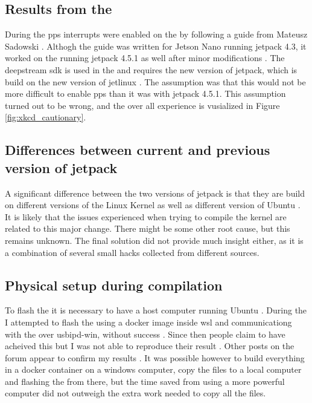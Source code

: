 \subsection{Results from the \preproject}
During the \preproject \gls{pps} interrupts were enabled on the \jx by following a guide from Mateusz Sadowski \cite{sadowskiEnablingPPSJetson2020} \cite[26]{martensPortableSensorRig2022}.
Althogh the guide was written for Jetson Nano running \gls{jetpack} 4.3, it worked on the \jx running \gls{jetpack} 4.5.1 as well after minor modifications \cite{sadowskiEnablingPPSJetson2020} \cite[26]{martensPortableSensorRig2022}.
The \gls{deepstream} \gls{sdk} is used in the \master and requires the new version of \gls{jetpack}, which is build on the new version of \gls{jetlinux}\cite{nvidiaDeepStreamSDKGet2019} \cite{nvidiaJetPackSDK2023}.
The assumption was that this would not be more difficult to enable \gls{pps} than it was with \gls{jetpack} 4.5.1.
This assumption turned out to be wrong, and the over all experience is vusialized in Figure \ref{fig:xkcd_cautionary}.

\subsection{Differences between current and previous version of \gls{jetpack}}
A significant difference between the two versions of \gls{jetpack} is that they are build on different versions of the Linux Kernel as well as different version of Ubuntu \cite{nvidiaJetPackSDK2022}\cite{nvidiaJetPackSDK2023}.
It is likely that the issues experienced when trying to compile the kernel are related to this major change.
There might be some other root cause, but this remains unknown.
The final solution did not provide much insight either, as it is a combination of several small hacks collected from different sources.

\subsection{Physical setup during compilation}
To flash the \jx it is necessary to have a host computer running Ubuntu \cite{nvidiaSDKManager2019}.
During the \preproject I attempted to flash the \jx using a docker image inside \gls{wsl} and communicationg with the \jx over usbipd-win, without success \cite{martensPortableSensorRig2022} \cite{nvidiaSDKManager2019} \cite{dorsselaerUsbipdwin2023}.
Since then people claim to have acheived this but I was not able to reproduce their result \jx \cite{makinbacon21TUTORIALUsingSdkmanager2022}.
Other posts on the forum appear to confirm my results \cite{2008PleaseProvideMore2022}.
It was possible however to build everything in a docker container on a windows computer, copy the files to a local computer and flashing the \jx from there,
but the time saved from using a more powerful computer did not outweigh the extra work needed to copy all the files.

